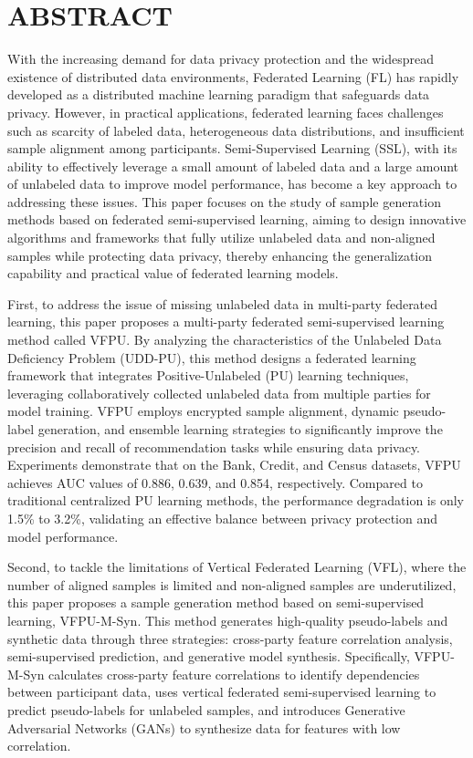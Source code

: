 



\chapter{ABSTRACT}
\xiaosi

With the increasing demand for data privacy protection and the widespread existence of distributed data environments, Federated Learning (FL) has rapidly developed as a distributed machine learning paradigm that safeguards data privacy. However, in practical applications, federated learning faces challenges such as scarcity of labeled data, heterogeneous data distributions, and insufficient sample alignment among participants. Semi-Supervised Learning (SSL), with its ability to effectively leverage a small amount of labeled data and a large amount of unlabeled data to improve model performance, has become a key approach to addressing these issues. This paper focuses on the study of sample generation methods based on federated semi-supervised learning, aiming to design innovative algorithms and frameworks that fully utilize unlabeled data and non-aligned samples while protecting data privacy, thereby enhancing the generalization capability and practical value of federated learning models.

First, to address the issue of missing unlabeled data in multi-party federated learning, this paper proposes a multi-party federated semi-supervised learning method called VFPU. By analyzing the characteristics of the Unlabeled Data Deficiency Problem (UDD-PU), this method designs a federated learning framework that integrates Positive-Unlabeled (PU) learning techniques, leveraging collaboratively collected unlabeled data from multiple parties for model training. VFPU employs encrypted sample alignment, dynamic pseudo-label generation, and ensemble learning strategies to significantly improve the precision and recall of recommendation tasks while ensuring data privacy. Experiments demonstrate that on the Bank, Credit, and Census datasets, VFPU achieves AUC values of 0.886, 0.639, and 0.854, respectively. Compared to traditional centralized PU learning methods, the performance degradation is only 1.5\% to 3.2\%, validating an effective balance between privacy protection and model performance.

Second, to tackle the limitations of Vertical Federated Learning (VFL), where the number of aligned samples is limited and non-aligned samples are underutilized, this paper proposes a sample generation method based on semi-supervised learning, VFPU-M-Syn. This method generates high-quality pseudo-labels and synthetic data through three strategies: cross-party feature correlation analysis, semi-supervised prediction, and generative model synthesis. Specifically, VFPU-M-Syn calculates cross-party feature correlations to identify dependencies between participant data, uses vertical federated semi-supervised learning to predict pseudo-labels for unlabeled samples, and introduces Generative Adversarial Networks (GANs) to synthesize data for features with low correlation.

